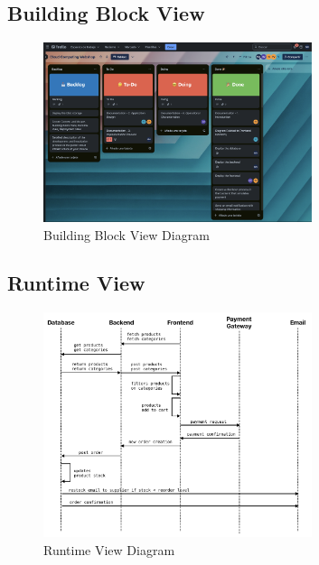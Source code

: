 \documentclass{llncs}
\begin{document}
\vphantom{}\\
\subsection{Building Block View}
\begin{figure}[htbp]
    \begin{center}
        \includegraphics[width=0.7\textwidth]{../diagrams/trello_board.png}
        \vspace{0.01\textwidth}
        \caption{Building Block View Diagram}
        \label{BuildingBlockView} %
    \end{center}
\end{figure}
\subsection{Runtime View}
\begin{figure}[htbp]
    \begin{center}
        \includegraphics[width=0.7\textwidth]{../diagrams/runtimeview.png}
        \vspace{0.01\textwidth}
        \caption{Runtime View Diagram}
        \label{RuntimeView} %
    \end{center}
\end{figure}
\end{document}
